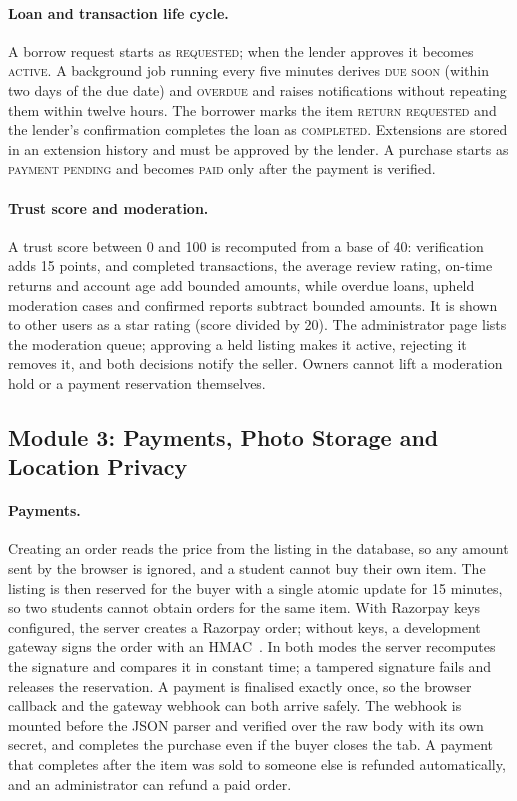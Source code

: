 \documentclass[12pt,letterpaper,twoside,openany]{report}
\newcommand{\st}[1]{\textsc{#1}}
\begin{document}
\paragraph{Loan and transaction life cycle.} A borrow request starts as \st{requested}; when the lender
approves it becomes \st{active}. A background job running every five minutes derives \st{due soon} (within
two days of the due date) and \st{overdue} and raises notifications without repeating them within twelve
hours. The borrower marks the item \st{return requested} and the lender's confirmation completes the loan as
\st{completed}. Extensions are stored in an extension history and must be approved by the lender. A purchase
starts as \st{payment pending} and becomes \st{paid} only after the payment is verified.

\paragraph{Trust score and moderation.} A trust score between 0 and 100 is recomputed from a base of 40:
verification adds 15 points, and completed transactions, the average review rating, on-time returns and
account age add bounded amounts, while overdue loans, upheld moderation cases and confirmed reports subtract
bounded amounts. It is shown to other users as a star rating (score divided by 20). The administrator page
lists the moderation queue; approving a held listing makes it active, rejecting it removes it, and both
decisions notify the seller. Owners cannot lift a moderation hold or a payment reservation themselves.

\subsection{Module 3: Payments, Photo Storage and Location Privacy}
\paragraph{Payments.} Creating an order reads the price from the listing in the database, so any amount
sent by the browser is ignored, and a student cannot buy their own item. The listing is then reserved for the
buyer with a single atomic update for 15 minutes, so two students cannot obtain orders for the same item.
With Razorpay keys configured, the server creates a Razorpay order; without keys, a development gateway signs
the order with an HMAC~\cite{hmac}. In both modes the server recomputes the signature and compares it in
constant time; a tampered signature fails and releases the reservation. A payment is finalised exactly once,
so the browser callback and the gateway webhook can both arrive safely. The webhook is mounted before the
JSON parser and verified over the raw body with its own secret, and completes the purchase even if the buyer
closes the tab. A payment that completes after the item was sold to someone else is refunded automatically,
and an administrator can refund a paid order.
\end{document}
